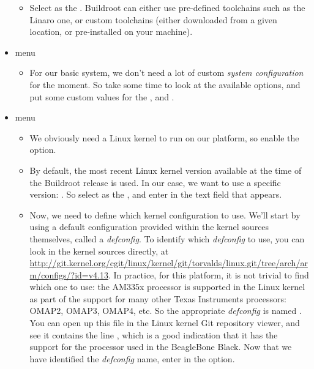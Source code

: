 \begin{itemize}
\begin{itemize}
  \item Select  as the
    . Buildroot can either use pre-defined toolchains
    such as the Linaro one, or custom toolchains (either downloaded
    from a given location, or pre-installed on your machine).

  \end{itemize}

\item {} menu

  \begin{itemize}

  \item For our basic system, we don't need a lot of custom {\em
      system configuration} for the moment. So take some time to look
    at the available options, and put some custom values for the
    ,  and .

  \end{itemize}

\item {} menu

  \begin{itemize}

  \item We obviously need a Linux kernel to run on our platform, so
    enable the  option.

  \item By default, the most recent Linux kernel version available at
    the time of the Buildroot release is used. In our case, we want to
    use a specific version: . So select  as the , and enter  in
    the  text field that appears.

  \item Now, we need to define which kernel configuration to
    use. We'll start by using a default configuration provided within
    the kernel sources themselves, called a {\em defconfig}. To
    identify which {\em defconfig} to use, you can look in the kernel
    sources directly, at
    \url{http://git.kernel.org/cgit/linux/kernel/git/torvalds/linux.git/tree/arch/arm/configs/?id=v4.13}. In
    practice, for this platform, it is not trivial to find which one
    to use: the AM335x processor is supported in the Linux kernel as
    part of the support for many other Texas Instruments processors:
    OMAP2, OMAP3, OMAP4, etc. So the appropriate {\em defconfig} is
    named . You can open up this file in the
    Linux kernel Git repository viewer, and see it contains the line
    , which is a good indication that it has
    the support for the processor used in the BeagleBone Black. Now
    that we have identified the {\em defconfig} name, enter
     in the  option.


\end{itemize}
\end{itemize}
